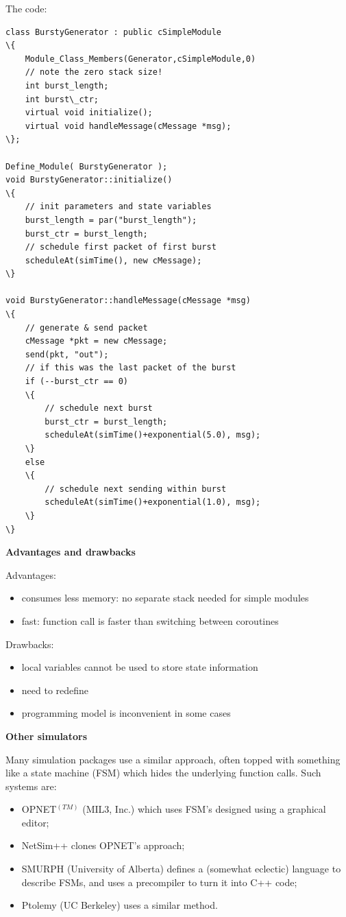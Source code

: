 The code:


\begin{Verbatim}[commandchars=\\\{\}]
class BurstyGenerator : public cSimpleModule
\{
    Module_Class_Members(Generator,cSimpleModule,0)
    // note the zero stack size!
    int burst_length;
    int burst\_ctr;
    virtual void initialize();
    virtual void handleMessage(cMessage *msg);
\};

Define_Module( BurstyGenerator );
void BurstyGenerator::initialize()
\{
    // init parameters and state variables
    burst_length = par("burst_length");
    burst_ctr = burst_length;
    // schedule first packet of first burst
    scheduleAt(simTime(), new cMessage);
\}

void BurstyGenerator::handleMessage(cMessage *msg)
\{
    // generate & send packet
    cMessage *pkt = new cMessage;
    send(pkt, "out");
    // if this was the last packet of the burst
    if (--burst_ctr == 0)
    \{
        // schedule next burst
        burst_ctr = burst_length;
        scheduleAt(simTime()+exponential(5.0), msg);
    \}
    else
    \{
        // schedule next sending within burst
        scheduleAt(simTime()+exponential(1.0), msg);
    \}
\}
\end{Verbatim}



\textbf{Advantages and drawbacks}


Advantages:
\begin{itemize}
\item{consumes less memory: no separate stack needed for
    simple modules}
\item{fast: function call is faster than switching between coroutines}
\end{itemize}


Drawbacks:
\begin{itemize}
\item{local variables cannot be used to store state information}
\item{need to redefine }
\item{programming model is inconvenient in some cases}
\end{itemize}

\textbf{Other simulators}


Many simulation packages use a similar approach, often topped with
something like a state machine
(FSM) which hides the underlying function calls. Such
systems are:
\begin{itemize}
  \item{OPNET$^{(TM)}$ (MIL3, Inc.) which uses FSM's designed using a graphical editor;}
  \item{NetSim++ clones OPNET's approach;}
  \item{SMURPH (University of Alberta) defines a (somewhat eclectic)
      language to describe FSMs, and uses a precompiler to turn it
      into C++ code;}
  \item{Ptolemy (UC Berkeley) uses a similar method.}
\end{itemize}

